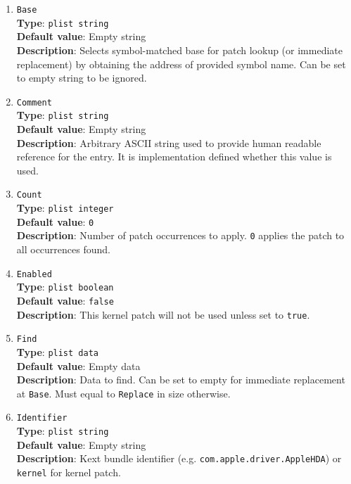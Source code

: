 \documentclass[]{article}
\begin{document}
\begin{enumerate}
\item
  \texttt{Base}\\
  \textbf{Type}: \texttt{plist\ string}\\
  \textbf{Default value}: Empty string\\
  \textbf{Description}: Selects symbol-matched base for patch lookup (or immediate
  replacement) by obtaining the address of provided symbol name. Can be set to
  empty string to be ignored.

\item
  \texttt{Comment}\\
  \textbf{Type}: \texttt{plist\ string}\\
  \textbf{Default value}: Empty string\\
  \textbf{Description}: Arbitrary ASCII string used to provide human readable
  reference for the entry. It is implementation defined whether this value is
  used.

\item
  \texttt{Count}\\
  \textbf{Type}: \texttt{plist\ integer}\\
  \textbf{Default value}: \texttt{0}\\
  \textbf{Description}: Number of patch occurrences to apply. \texttt{0} applies
  the patch to all occurrences found.

\item
  \texttt{Enabled}\\
  \textbf{Type}: \texttt{plist\ boolean}\\
  \textbf{Default value}: \texttt{false}\\
  \textbf{Description}: This kernel patch will not be used unless set to
  \texttt{true}.

\item
  \texttt{Find}\\
  \textbf{Type}: \texttt{plist\ data}\\
  \textbf{Default value}: Empty data\\
  \textbf{Description}: Data to find. Can be set to empty for immediate
  replacement at \texttt{Base}. Must equal to \texttt{Replace} in size
  otherwise.

\item
  \texttt{Identifier}\\
  \textbf{Type}: \texttt{plist\ string}\\
  \textbf{Default value}: Empty string\\
  \textbf{Description}: Kext bundle identifier (e.g. \texttt{com.apple.driver.AppleHDA})
  or \texttt{kernel} for kernel patch.


\end{enumerate}
\end{document}
